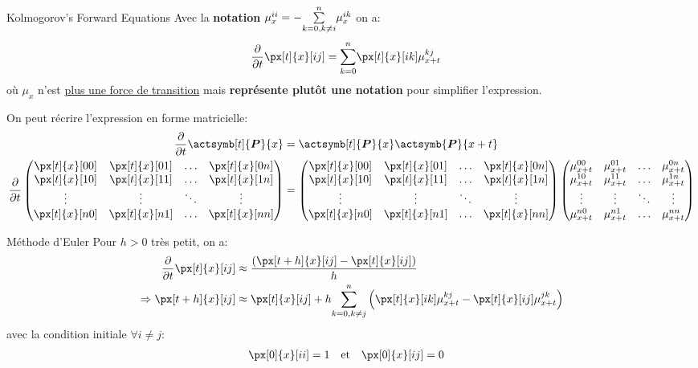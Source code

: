 \documentclass[10pt, french]{article}
\begin{document}
\begin{multicols*}{2}
\begin{conceptgen}{Kolmogorov's Forward Equations}
Avec la \textbf{notation} $\mu_{x}^{ii} = - \overset{n}{\underset{k = 0, k \neq i}{\sum}} \mu_{x}^{ik}$ on a:
\begin{align*}
	\derivee{t}{} \px[t]{x}[ij]
	&=	\sumz{n}{k = 0} \px[t]{x}[ik] \mu_{x + t}^{kj}
\end{align*}
où $\mu_{x}$ n'est \underline{plus une force de transition} mais \textbf{représente plutôt une notation} pour simplifier l'expression.
\end{conceptgen}

On peut récrire l'expression en forme matricielle:
	\setlength{\mathindent}{-1cm}
\begin{align*}
	\derivee{t}{} \actsymb[t]{\bm{P}}{x}
	&=	\actsymb[t]{\bm{P}}{x} \actsymb{\bm{P}}{x + t}	\\
	\derivee{t}{}
	\begin{pmatrix}
	\px[t]{x}[00]	&	\px[t]{x}[01]	&	\dots	&	\px[t]{x}[0n]	\\
	\px[t]{x}[10]	&	\px[t]{x}[11]	&	\dots	&	\px[t]{x}[1n]	\\
	\vdots			&	\vdots			&	\ddots	&	\vdots	\\
	\px[t]{x}[n0]	&	\px[t]{x}[n1]	&	\dots	&	\px[t]{x}[nn]	
	\end{pmatrix}
	&=	
	\begin{pmatrix}
	\px[t]{x}[00]	&	\px[t]{x}[01]	&	\dots	&	\px[t]{x}[0n]	\\
	\px[t]{x}[10]	&	\px[t]{x}[11]	&	\dots	&	\px[t]{x}[1n]	\\
	\vdots			&	\vdots			&	\ddots	&	\vdots	\\
	\px[t]{x}[n0]	&	\px[t]{x}[n1]	&	\dots	&	\px[t]{x}[nn]	
	\end{pmatrix}
	\begin{pmatrix}
	\mu_{x + t}^{00}	&	\mu_{x + t}^{01}	&	\dots	&	\mu_{x + t}^{0n}	\\
	\mu_{x + t}^{10}	&	\mu_{x + t}^{11}	&	\dots	&	\mu_{x + t}^{1n}	\\
	\vdots			&	\vdots			&	\ddots	&	\vdots	\\
	\mu_{x + t}^{n0}	&	\mu_{x + t}^{n1}	&	\dots	&	\mu_{x + t}^{nn}	
	\end{pmatrix}
\end{align*}
	\setlength{\mathindent}{1cm}
	
\begin{conceptgen}{Méthode d'Euler}
Pour $h > 0$ très petit, on a: 
\begin{align*}
	\derivee{t}{} \px[t]{x}[ij]
	&\approx	\frac{(\px[t + h]{x}[ij] - \px[t]{x}[ij])}{h}	\\
	\Rightarrow
	\px[t + h]{x}[ij]
	&\approx	 \px[t]{x}[ij] + h\sumz{n}{k = 0, k \neq j} \left( \px[t]{x}[ik] \mu_{x + t}^{kj} - \px[t]{x}[ij] \mu_{x + t}^{jk}  \right)
\end{align*}
avec la condition initiale $\forall i \neq j$:
\begin{align*}
	\px[0]{x}[ii]	&=	1	&	&\text{et}	&	\px[0]{x}[ij]	&=	0
\end{align*}
\end{conceptgen}


\end{multicols*}
\end{document}
